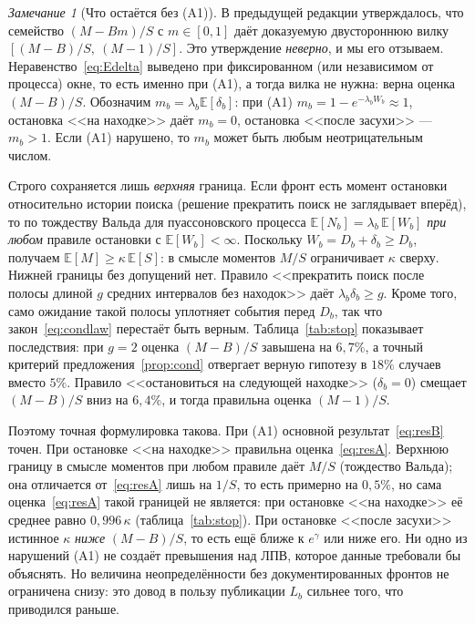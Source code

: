 \documentclass[11pt,a4paper]{article}
\theoremstyle{plain}
\theoremstyle{remark}
\newtheorem{remark}{Замечание}
\newcommand{\eg}{e^{\gamma}}
\begin{document}
\begin{remark}[Что остаётся без (A1)]\label{rem:bracket}
В предыдущей редакции утверждалось, что семейство $(M-Bm)/S$ с $m\in[0,1]$ даёт
доказуемую двустороннюю вилку $[(M-B)/S,\ (M-1)/S]$. Это утверждение
\emph{неверно}, и мы его отзываем. Неравенство~\eqref{eq:Edelta} выведено при
фиксированном (или независимом от процесса) окне, то есть именно при (A1), а
тогда вилка не нужна: верна оценка $(M-B)/S$. Обозначим
$m_b=\lambda_b\mathbb E[\delta_b]$: при (A1) $m_b=1-e^{-\lambda_bW_b}\approx1$,
остановка <<на находке>> даёт $m_b=0$, остановка <<после засухи>> ---
$m_b>1$. Если (A1) нарушено, то $m_b$ может быть любым неотрицательным числом.

Строго сохраняется лишь \emph{верхняя} граница. Если фронт есть момент
остановки относительно истории поиска (решение прекратить поиск не заглядывает
вперёд), то по тождеству Вальда для пуассоновского процесса
$\mathbb E[N_b]=\lambda_b\,\mathbb E[W_b]$ \emph{при любом} правиле остановки с
$\mathbb E[W_b]<\infty$. Поскольку $W_b=D_b+\delta_b\ge D_b$, получаем
$\mathbb E[M]\ge\kappa\,\mathbb E[S]$: в смысле моментов $M/S$ ограничивает $\kappa$
сверху. Нижней границы без допущений нет. Правило <<прекратить поиск после полосы
длиной $g$ средних интервалов без находок>> даёт $\lambda_b\delta_b\ge g$. Кроме
того, само ожидание такой полосы уплотняет события перед $D_b$, так что
закон~\eqref{eq:condlaw} перестаёт быть верным. Таблица~\ref{tab:stop} показывает
последствия: при $g=2$ оценка $(M-B)/S$ завышена на $6{,}7\%$, а точный критерий
предложения~\ref{prop:cond} отвергает верную гипотезу в $18\%$ случаев вместо
$5\%$. Правило <<остановиться на следующей находке>> ($\delta_b=0$) смещает
$(M-B)/S$ вниз на $6{,}4\%$, и тогда правильна оценка $(M-1)/S$.

Поэтому точная формулировка такова. При (A1) основной результат~\eqref{eq:resB}
точен. При остановке <<на находке>> правильна оценка~\eqref{eq:resA}. Верхнюю
границу в смысле моментов при любом правиле даёт $M/S$ (тождество Вальда); она
отличается от~\eqref{eq:resA} лишь на $1/S$, то есть примерно на $0{,}5\%$, но
сама оценка~\eqref{eq:resA} такой границей не является: при остановке <<на
находке>> её среднее равно $0{,}996\,\kappa$ (таблица~\ref{tab:stop}). При остановке
<<после засухи>> истинное $\kappa$ \emph{ниже} $(M-B)/S$, то есть ещё ближе к
$\eg$ или ниже его. Ни одно из нарушений (A1) не создаёт превышения над ЛПВ,
которое данные требовали бы объяснять. Но величина неопределённости без
документированных фронтов не ограничена снизу: это довод в пользу
публикации $L_b$ сильнее того, что приводился раньше.
\end{remark}
\end{document}
